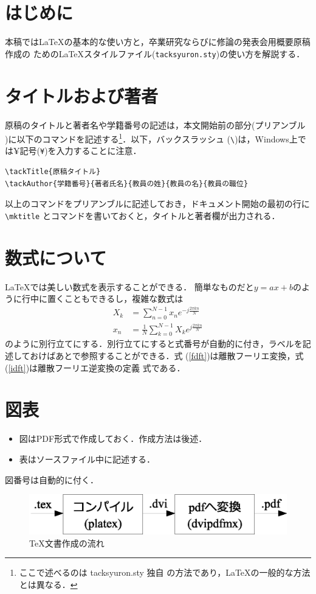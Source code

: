 \documentclass[uplatex,a4paper,9pt]{bxjsarticle}
\begin{document}
\mktitle
\section{はじめに}
本稿では\LaTeX の基本的な使い方と，卒業研究ならびに修論の発表会用概要原稿作成の
ための\LaTeX スタイルファイル(\verb|tacksyuron.sty|)の使い方を解説する．
\section{タイトルおよび著者}
原稿のタイトルと著者名や学籍番号の記述は，本文開始前の部分(プリアンブル
)に以下のコマンドを記述する\footnote{ここで述べるのは tacksyuron.sty 独自
  の方法であり，\LaTeX の一般的な方法とは異なる．}．以下，バックスラッシュ
  (\verb|\|)は，Windows上では¥記号(\verb|¥|)を入力することに注意．
\begin{verbatim}
\tackTitle{原稿タイトル}
\tackAuthor{学籍番号}{著者氏名}{教員の姓}{教員の名}{教員の職位}
\end{verbatim}
以上のコマンドをプリアンブルに記述しておき，ドキュメント開始の最初の行に
\verb|\mktitle|
とコマンドを書いておくと，タイトルと著者欄が出力される．
\section{数式について}
\LaTeX では美しい数式を表示することができる．
簡単なものだと$y=ax+b$のように行中に置くこともできるし，複雑な数式は
\begin{align}
X_k &= \sum_{n=0}^{N-1}x_n e^{-j\frac{2\pi kn}{N}} \label{fdft}\\
x_n &= \frac{1}{N}\sum_{k=0}^{N-1}X_k e^{j\frac{2\pi kn}{N}} \label{idft}
\end{align}
のように別行立てにする．別行立てにすると式番号が自動的に付き，ラベルを記
述しておけばあとで参照することができる．式
(\ref{fdft})は離散フーリエ変換，式(\ref{idft})は離散フーリエ逆変換の定義
式である．
\section{図表}
\begin{itemize}
\item 図はPDF形式で作成しておく．作成方法は後述．
\item 表はソースファイル中に記述する．
\end{itemize}
図番号は自動的に付く．
\begin{figure}[b]
\centering
\includegraphics[width=0.8\columnwidth]{./testfig.eps}
\caption{\TeX 文書作成の流れ}
\label{fig1}
\end{figure}
\end{document}
